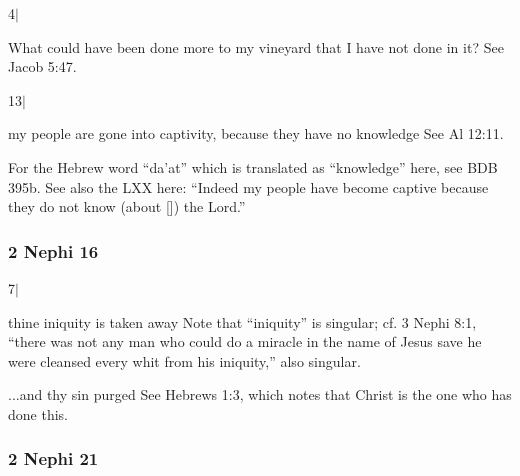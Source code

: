 		\begin{compactdesc}

		\item[4$\vert$]
		\begin{compactdesc}
		\item[What could have been done more to my vineyard that I have not done in it?] See Jacob 5:47.
		\end{compactdesc}

		\item[13$\vert$]
		\begin{compactdesc}
		\item[my people are gone into captivity, because they have no knowledge] See Al 12:11.

		For the Hebrew word ``da'at'' which is translated as ``knowledge'' here, see BDB 395b. See also the LXX here: ``Indeed my people have become captive because they do not know (about []) the Lord.''
		\end{compactdesc}

		\end{compactdesc}

	\subsubsection{2 Nephi 16} %

		\begin{compactdesc}

		\item[7$\vert$]
		\begin{compactdesc}
		\item[thine iniquity is taken away] Note that ``iniquity'' is singular; cf. 3 Nephi 8:1, ``there was not any man who could do a miracle in the name of Jesus save he were cleansed every whit from his iniquity,'' also singular.

		\item[...and thy sin purged] See Hebrews 1:3, which notes that Christ is the one who has done this.
		\end{compactdesc}

		\end{compactdesc}

	\subsubsection{2 Nephi 21} %

